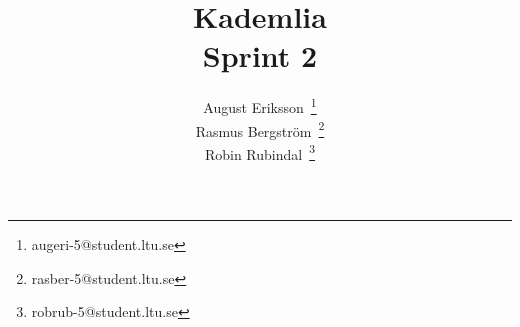 \documentclass[a4paper]{article}
\title{Kademlia\\ \medskip{}
  \large{Sprint 2}
}
\author{
  August Eriksson~\thanks{augeri-5@student.ltu.se}\\
  Rasmus Bergström~\thanks{rasber-5@student.ltu.se}\\
  Robin Rubindal~\thanks{robrub-5@student.ltu.se}\\
}
\begin{document}
\maketitle
\newpage



\newpage






\newpage



\appendix{}
\newpage






\end{document}
